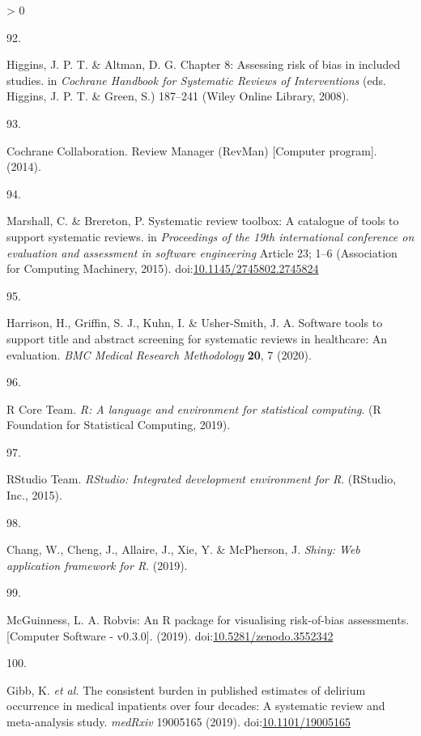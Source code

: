 \documentclass[a4paper, twoside]{templates/ociamthesis}
\newlength{\cslhangindent}
\newlength{\csllabelwidth}
\newenvironment{CSLReferences}[3] %
 {%
  \setlength{\parindent}{0pt}
  \ifodd #1 \everypar{\setlength{\hangindent}{\cslhangindent}}\ignorespaces\fi
  \ifnum #2 > 0
  \setlength{\parskip}{#2\baselineskip}
  \fi
 }%
 {}
\newcommand{\CSLLeftMargin}[1]{\parbox[t]{\maxof{\widthof{#1}}{\csllabelwidth}}{#1}}
\newcommand{\CSLRightInline}[1]{\parbox[t]{\linewidth - \csllabelwidth}{#1}}
\begin{document}
\begin{CSLReferences}{0}{0}
\leavevmode\hypertarget{ref-higgins2008assessing}{}%
\CSLLeftMargin{92. }
\CSLRightInline{Higgins, J. P. T. \& Altman, D. G. Chapter 8: {Assessing} risk of bias in included studies. in \emph{Cochrane {Handbook} for {Systematic Reviews} of {Interventions}} (eds. Higgins, J. P. T. \& Green, S.) 187--241 ({Wiley Online Library}, 2008).}

\leavevmode\hypertarget{ref-cochrane2014review}{}%
\CSLLeftMargin{93. }
\CSLRightInline{Cochrane Collaboration. Review {Manager} ({RevMan}) {[}{Computer} program{]}. (2014).}

\leavevmode\hypertarget{ref-marshall2015systematic}{}%
\CSLLeftMargin{94. }
\CSLRightInline{Marshall, C. \& Brereton, P. Systematic review toolbox: A catalogue of tools to support systematic reviews. in \emph{Proceedings of the 19th international conference on evaluation and assessment in software engineering} Article 23; 1--6 ({Association for Computing Machinery}, 2015). doi:\href{https://doi.org/10.1145/2745802.2745824}{10.1145/2745802.2745824}}

\leavevmode\hypertarget{ref-harrison2020software}{}%
\CSLLeftMargin{95. }
\CSLRightInline{Harrison, H., Griffin, S. J., Kuhn, I. \& Usher-Smith, J. A. Software tools to support title and abstract screening for systematic reviews in healthcare: An evaluation. \emph{BMC Medical Research Methodology} \textbf{20}, 7 (2020).}

\leavevmode\hypertarget{ref-rref}{}%
\CSLLeftMargin{96. }
\CSLRightInline{R Core Team. \emph{R: {A} language and environment for statistical computing}. ({R Foundation for Statistical Computing}, 2019).}

\leavevmode\hypertarget{ref-rstudioref}{}%
\CSLLeftMargin{97. }
\CSLRightInline{RStudio Team. \emph{{RStudio}: {Integrated} development environment for {R}}. ({RStudio, Inc.}, 2015).}

\leavevmode\hypertarget{ref-shinyref}{}%
\CSLLeftMargin{98. }
\CSLRightInline{Chang, W., Cheng, J., Allaire, J., Xie, Y. \& McPherson, J. \emph{Shiny: {Web} application framework for {R}}. (2019).}

\leavevmode\hypertarget{ref-mcguinness2019a}{}%
\CSLLeftMargin{99. }
\CSLRightInline{McGuinness, L. A. Robvis: {An R} package for visualising risk-of-bias assessments. {[}{Computer Software} - v0.3.0{]}. (2019). doi:\href{https://doi.org/10.5281/zenodo.3552342}{10.5281/zenodo.3552342}}

\leavevmode\hypertarget{ref-gibb2019consistent}{}%
\CSLLeftMargin{100. }
\CSLRightInline{Gibb, K. \emph{et al.} The consistent burden in published estimates of delirium occurrence in medical inpatients over four decades: A systematic review and meta-analysis study. \emph{medRxiv} 19005165 (2019). doi:\href{https://doi.org/10.1101/19005165}{10.1101/19005165}}


\end{CSLReferences}
\end{document}

